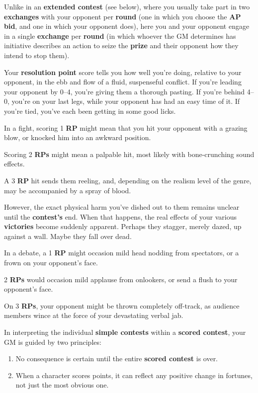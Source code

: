 \documentclass[
]{article}
\providecommand{\tightlist}{%
  \setlength{\itemsep}{0pt}\setlength{\parskip}{0pt}}
\begin{document}
Unlike in an \textbf{extended contest} (see below), where you usually
take part in two \textbf{exchanges} with your opponent per
\textbf{round} (one in which you choose the \textbf{AP bid}, and one in
which your opponent does), here you and your opponent engage in a single
\textbf{exchange} per \textbf{round} (in which whoever the GM determines
has initiative describes an action to seize the \textbf{prize} and their
opponent how they intend to stop them).

Your \textbf{resolution point} score tells you how well you're doing,
relative to your opponent, in the ebb and flow of a fluid, suspenseful
conflict. If you're leading your opponent by 0--4, you're giving them a
thorough pasting. If you're behind 4--0, you're on your last legs, while
your opponent has had an easy time of it. If you're tied, you've each
been getting in some good licks.

In a fight, scoring 1 \textbf{RP} might mean that you hit your opponent
with a grazing blow, or knocked him into an awkward position.

Scoring 2 \textbf{RPs} might mean a palpable hit, most likely with
bone-crunching sound effects.

A 3 \textbf{RP} hit sends them reeling, and, depending on the realism
level of the genre, may be accompanied by a spray of blood.

However, the exact physical harm you've dished out to them remains
unclear until the \textbf{contest's} end. When that happens, the real
effects of your various \textbf{victories} become suddenly apparent.
Perhaps they stagger, merely dazed, up against a wall. Maybe they fall
over dead.

In a debate, a 1 \textbf{RP} might occasion mild head nodding from
spectators, or a frown on your opponent's face.

2 \textbf{RPs} would occasion mild applause from onlookers, or send a
flush to your opponent's face.

On 3 \textbf{RPs}, your opponent might be thrown completely off-track,
as audience members wince at the force of your devastating verbal jab.

In interpreting the individual \textbf{simple contests} within a
\textbf{scored contest}, your GM is guided by two principles:

\begin{enumerate}
\def\labelenumi{\arabic{enumi}.}
\tightlist
\item
  No consequence is certain until the entire \textbf{scored contest} is
  over.
\item
  When a character scores points, it can reflect any positive change in
  fortunes, not just the most obvious one.
\end{enumerate}
\end{document}
